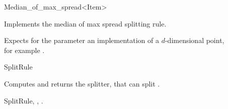 

\begin{ccRefFunctionObjectClass}{Median_of_max_spread<Item>}  %


\begin{ccAdvanced}

\ccDefinition
Implements the median of max spread splitting rule.


\ccParameters

Expects for the parameter  an implementation of 
a $d$-dimensional point, \\
for example .

\ccIsModel

SplitRule

\ccTypes


\ccCreation
{}  %



{Computes and returns the splitter, that can split .}

\ccSeeAlso

SplitRule,
,
.

\end{ccAdvanced}

\end{ccRefFunctionObjectClass}


